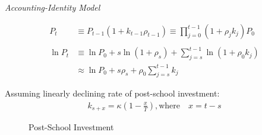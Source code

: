 \begin{frame}\begin{center}
\LARGE\textit{Accounting-Identity Model}
\end{center}\end{frame}

\begin{frame}
\begin{align*}
P_t & \equiv P_{t - 1} (1 + k_{t - 1} \rho_{t - 1}) \equiv \prod^{t - 1}_{j= 0} (1 + \rho_jk_j)P_0 \\
& \\
\ln P_t & \equiv \ln P_0  + s \ln(1 + \rho_s) + \sum^{t -1}_{j=s} \ln(1 + \rho_0 k_j) \\
& \approx  \ln P_0 + s \rho_s + \rho_0 \sum^{t - 1}_{j=s} k_j
\end{align*}
\end{frame}



\begin{frame}
Assuming linearly declining rate of post-school investment:
\begin{align*}
k_{s + x} = \kappa\left( 1 - \frac{x}{T}\right),\text{where} \quad x = t - s
\end{align*}
\end{frame}

\begin{frame}
\begin{figure}[htp]\centering
\caption{Post-School Investment}\label{Post-School Investment}
\end{figure}
\end{frame}

